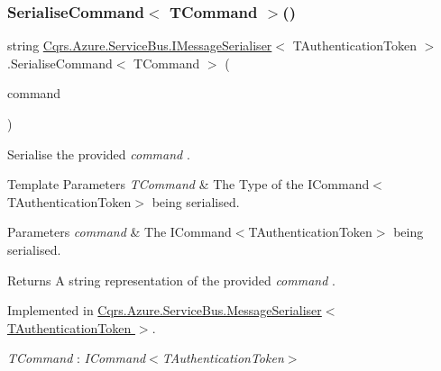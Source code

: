 \subsubsection{\texorpdfstring{Serialise\+Command$<$ T\+Command $>$()}{SerialiseCommand< TCommand >()}}
{\footnotesize\ttfamily string \hyperlink{interfaceCqrs_1_1Azure_1_1ServiceBus_1_1IMessageSerialiser}{Cqrs.\+Azure.\+Service\+Bus.\+I\+Message\+Serialiser}$<$ T\+Authentication\+Token $>$.Serialise\+Command$<$ T\+Command $>$ (\begin{DoxyParamCaption}\item[{T\+Command}]{command }\end{DoxyParamCaption})}



Serialise the provided {\itshape command} . 


\begin{DoxyTemplParams}{Template Parameters}
{\em T\+Command} & The Type of the I\+Command$<$\+T\+Authentication\+Token$>$ being serialised.\\
\hline
\end{DoxyTemplParams}

\begin{DoxyParams}{Parameters}
{\em command} & The I\+Command$<$\+T\+Authentication\+Token$>$ being serialised.\\
\hline
\end{DoxyParams}
\begin{DoxyReturn}{Returns}
A string representation of the provided {\itshape command} .
\end{DoxyReturn}


Implemented in \hyperlink{classCqrs_1_1Azure_1_1ServiceBus_1_1MessageSerialiser_a72ab8d3bd734eeb4ae80d3dcd36fa7e7_a72ab8d3bd734eeb4ae80d3dcd36fa7e7}{Cqrs.\+Azure.\+Service\+Bus.\+Message\+Serialiser$<$ T\+Authentication\+Token $>$}.

\begin{Desc}
\item[Type Constraints]\begin{description}
\item[{\em T\+Command} : {\em I\+Command$<$T\+Authentication\+Token$>$}]\end{description}
\end{Desc}
\mbox{\label{interfaceCqrs_1_1Azure_1_1ServiceBus_1_1IMessageSerialiser_af6e1bca15164a08308969794b089c31b_af6e1bca15164a08308969794b089c31b}} 
